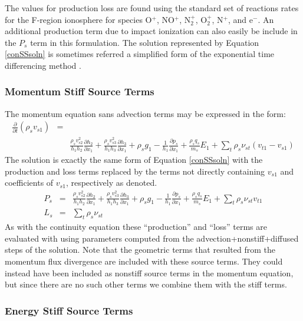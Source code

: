 \documentclass[11pt,letterpaper]{article}
\begin{document}
The values for production loss are found using the standard set of reactions rates for the F-region ionosphere for species O$^+$, NO$^+$, N$_2^+$, O$_2^+$, N$^+$, and e$^-$.  An additional production term due to impact ionization can also easily be include in the $P_s$ term in this formulation.  The solution represented by Equation \ref{conSSsoln} is sometimes referred a simplified form of the exponential time differencing method \citep{Leveque:2007}.  

\subsubsection{Momentum Stiff Source Terms}

The momentum equation sans advection terms may be expressed in the form:
\begin{eqnarray}
\frac{\partial}{\partial t} \left( \rho_s v_{s1} \right) &=& \nonumber \\
~ &~& \frac{\rho_s v_{s2}^2}{h_1 h_2} \frac{\partial h_2}{\partial x_1} + \frac{\rho_s v_{s3}^2}{h_1 h_3} \frac{\partial h_3}{\partial x_1}  + \rho_s g_1 - \frac{1}{h_1} \frac{\partial p_s}{\partial x_1} + \frac{\rho_s q_s}{m_s} E_1 + \sum_t \rho_s \nu_{st} \left( v_{t1} - v_{s1} \right)
\end{eqnarray}
The solution is exactly the same form of Equation \ref{conSSsoln} with the production and loss terms replaced by the terms not directly containing $v_{s1}$ and coefficients of $v_{s1}$, respectively as denoted.  
\begin{eqnarray}
P_s &=& \frac{\rho_s v_{s2}^2}{h_1 h_2} \frac{\partial h_2}{\partial x_1} + \frac{\rho_s v_{s3}^2}{h_1 h_3} \frac{\partial h_3}{\partial x_1}  + \rho_s g_1 - \frac{1}{h_1} \frac{\partial p_s}{\partial x_1} + \frac{\rho_s q_s}{m_s} E_1 + \sum_t \rho_s \nu_{st} v_{t1} \nonumber \\
L_s &=& \sum_t \rho_s \nu_{st}
\end{eqnarray}
As with the continuity equation these ``production'' and ``loss'' terms are evaluated with using parameters computed from the advection+nonstiff+diffused steps of the solution.  Note that the geometric terms that resulted from the momentum flux divergence are included with these source terms.  They could instead have been included as nonstiff source terms in the momentum equation, but since there are no such other terms we combine them with the stiff terms.

\subsubsection{Energy Stiff Source Terms}
\end{document}
